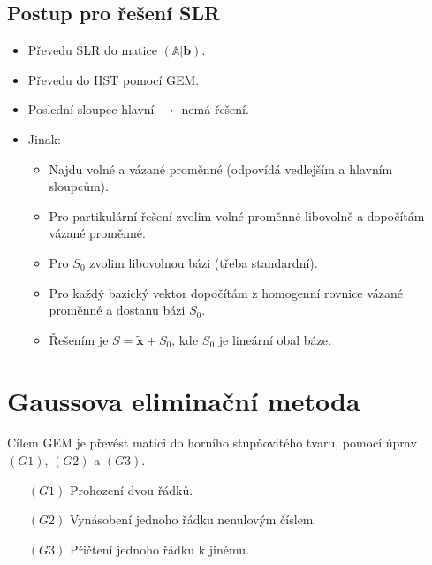 \documentclass{szzclass}
\newcommand{\mathbbm}[1]{\boldsymbol#1}
\begin{document}
\subsection{Postup pro řešení SLR}
\begin{itemize}
\item Převedu SLR do matice $(\mathbb{A}|\mathbbm{b})$.
\item Převedu do HST pomocí GEM.
\item Poslední sloupec hlavní $\rightarrow$ nemá řešení.
\item Jinak:
  \begin{itemize}
  \item Najdu volné a vázané proměnné (odpovídá vedlejším a hlavním sloupcům).
  \item Pro partikulární řešení zvolim volné proměnné libovolně a dopočítám vázané proměnné.
  \item Pro $S_0$ zvolim libovolnou bázi (třeba standardní).
  \item Pro každý bazický vektor dopočítám z homogenní rovnice vázané proměnné a dostanu bázi $S_0$.
  \item Řešením je $S=\widetilde{\mathbbm{x}}+S_0$, kde $S_0$ je lineární obal báze.
  \end{itemize}
\end{itemize}

\section{Gaussova eliminační metoda}
Cílem GEM je převést matici do horního stupňovitého tvaru, pomocí úprav $(G1)$, $(G2)$ a $(G3)$.

\begin{itemize}
\item[$(G1)$] Prohození dvou řádků.
\item[$(G2)$] Vynásobení jednoho řádku nenulovým číslem.
\item[$(G3)$] Přičtení jednoho řádku k jinému.
\end{itemize}
\end{document}
